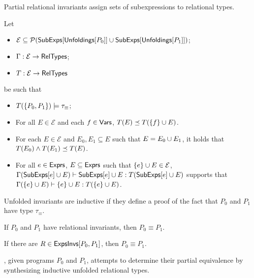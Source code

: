 %
Partial relational invariants assign sets of subexpressions to
relational types.
%
\begin{defn}
  \label{defn:inferred-invs}
  Let
  \begin{itemize}
  \item 
    $\mathcal{E} \subseteq \mathcal{P}(\mathsf{SubExps}[  \mathsf{Unfoldings}[ P_0 ]  ] \cup
      \mathsf{SubExps}[ \mathsf{Unfoldings}[ P_1 ]  ])$;
  \item
    $\Gamma : \mathcal{E} \to \mathsf{RelTypes}$;
  \item
    $T : \mathcal{E} \to \mathsf{RelTypes}$
  \end{itemize}
  be such that 
  \begin{itemize}
  \item 
    $T( \{  P_0, P_1  \} ) \models \tau_{ \equiv }$; 
  \item 
    For all $E \in \mathcal{E}$ and each $f \in \mathsf{Vars}$, $T(E) \preceq
    T(\{  f  \} \cup  E )$.
  \item 
    For each $E \in \mathcal{E}$ and $E_0, E_1 \subseteq E$ such that
    $E = E_0 \cup E_1$, it holds that $T(E_0) \land T(E_1) \preceq
    T(E)$.
  \item 
    For all $e \in \mathsf{Exprs}$, $E \subseteq \mathsf{Exprs}$ such that $\{  e  \} \cup  E
     \in \mathcal{ E }$, $\Gamma(\mathsf{SubExps}[ e ] \cup E) \vdash
    \mathsf{SubExps}[  e  ] \cup E : T( \mathsf{SubExps}[ e ] \cup E)$ supports that
    $\Gamma(\{  e  \} \cup  E ) \vdash \{  e  \} \cup  E  : T(\{  e  \} \cup  E
    )$.
  \end{itemize}
\end{defn}
%
%

Unfolded invariants are inductive if they define a proof of the fact
that $P_0$ and $P_1$ have type $\tau_{\equiv}$.
% 
\begin{defn}
  \label{defn:ind-unfolded}
\end{defn}

If $P_0$ and $P_1$ have relational invariants, then $P_0 \equiv P_1$.
%
\begin{lemma}
  \label{lemma:equiv-evidence}
  If there are $R \in \mathsf{ExpsInvs}[ P_0, P_1 ]$, then $P_0 \equiv P_1$.
\end{lemma}
%
\sys, given programs $P_0$ and $P_1$, attempts to determine their
partial equivalence by synthesizing inductive unfolded relational
types.

